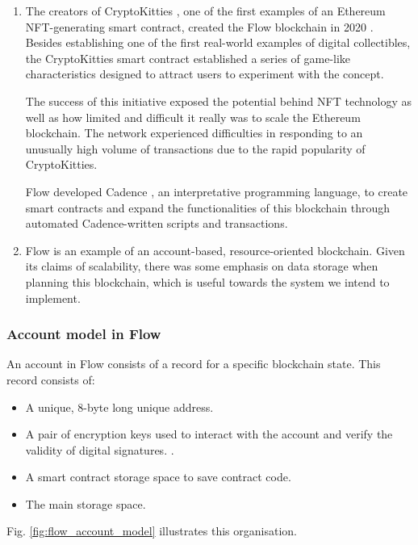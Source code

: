 \documentclass[./4_GeneralApproach.tex]{subfiles}
\begin{document}
\begin{enumerate}
    \item{The creators of CryptoKitties \cite{Gharegozlou2019}, one of the first examples of an Ethereum NFT-generating smart contract, created the Flow blockchain in 2020 \cite{Hentschel2019a}. Besides establishing one of the first real-world examples of digital collectibles, the CryptoKitties smart contract established a series of game-like characteristics designed to attract users to experiment with the concept.
          \par
          The success of this initiative exposed the potential behind NFT technology as well as how limited and difficult it really was to scale the Ethereum blockchain. The network experienced difficulties in responding to an unusually high volume of transactions due to the rapid popularity of CryptoKitties.
          \par
          Flow developed Cadence \cite{Cadence2023}, an interpretative programming language, to create smart contracts and expand the functionalities of this blockchain through automated Cadence-written scripts and transactions.}

    \item{Flow is an example of an account-based, resource-oriented blockchain. Given its claims of scalability, there was some emphasis on data storage when planning this blockchain, which is useful towards the system we intend to implement.}

\end{enumerate}

\subsubsection{Account model in Flow}
\label{flow_accounts}
An account in Flow consists of a record for a specific blockchain state. This record consists of:

\begin{itemize}
    \item{A unique, 8-byte long unique address.}
    \item{A pair of encryption keys used to interact with the account and verify the validity of digital signatures. \cite{flow2024}}.
    \item{A smart contract storage space to save contract code.}
    \item{The main storage space.}
\end{itemize}

Fig. \ref{fig:flow_account_model} illustrates this organisation.
\end{document}
